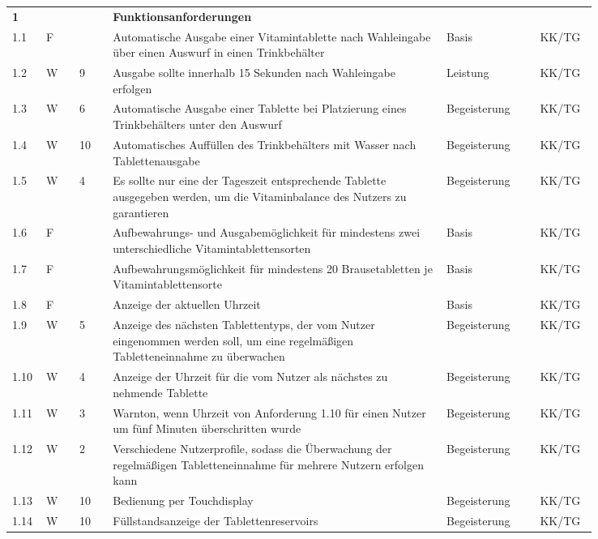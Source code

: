 \begin{longtable}{C{0.03\linewidth}C{0.05\linewidth}C{0.05\linewidth}L{0.5\linewidth}C{0.14\linewidth}C{0.07\linewidth}}
	\textbf{1} & & & \textbf{Funktionsanforderungen} && \\
	1.1 & F & & Automatische Ausgabe einer Vitamintablette nach Wahleingabe über einen Auswurf in einen Trinkbehälter & Basis & KK/TG\\
	1.2 & W & 9 & Ausgabe sollte innerhalb 15 Sekunden nach Wahleingabe erfolgen & Leistung & KK/TG\\
	1.3 & W & 6 & Automatische Ausgabe einer Tablette bei Platzierung eines Trinkbehälters unter den Auswurf&Begeisterung& KK/TG\\
	1.4 & W & 10 & Automatisches Auffüllen des Trinkbehälters mit Wasser nach Tablettenausgabe &Begeisterung& KK/TG\\
	1.5 & W & 4 & Es sollte nur eine der Tageszeit entsprechende Tablette ausgegeben werden, um die Vitaminbalance des Nutzers zu garantieren &Begeisterung& KK/TG \\
	1.6 & F & & Aufbewahrungs- und Ausgabemöglichkeit für mindestens zwei unterschiedliche Vitamintablettensorten & Basis & KK/TG\\
	1.7 & F & & Aufbewahrungsmöglichkeit für mindestens 20 Brausetabletten je Vitamintablettensorte & Basis & KK/TG\\
	1.8 & F & & Anzeige der aktuellen Uhrzeit & Basis & KK/TG\\
	1.9 & W & 5 & Anzeige des nächsten Tablettentyps, der vom Nutzer eingenommen werden soll, um eine regelmäßigen Tabletteneinnahme zu überwachen &Begeisterung& KK/TG\\
	1.10 & W & 4 & Anzeige der Uhrzeit für die vom Nutzer als nächstes zu nehmende Tablette &Begeisterung& KK/TG\\
	1.11 & W & 3 & Warnton, wenn Uhrzeit von Anforderung 1.10 für einen Nutzer um fünf Minuten überschritten wurde &Begeisterung& KK/TG\\
	1.12 & W & 2 & Verschiedene Nutzerprofile, sodass die Überwachung der regelmäßigen Tabletteneinnahme für mehrere Nutzern erfolgen kann &Begeisterung& KK/TG\\
	1.13 & W & 10 & Bedienung per Touchdisplay &Begeisterung& KK/TG\\
	1.14 & W & 10 & Füllstandsanzeige der Tablettenreservoirs &Begeisterung& KK/TG\\
	
	\midrule
	

\end{longtable}
